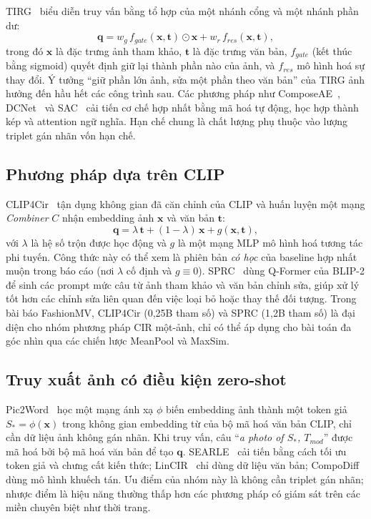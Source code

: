 TIRG~\cite{vo2019tirg} biểu diễn truy vấn bằng tổ hợp của một nhánh cổng và một nhánh phần dư:
\begin{equation}
    \mathbf{q} = w_g\, f_{gate}(\mathbf{x}, \mathbf{t}) \odot \mathbf{x} + w_r\, f_{res}(\mathbf{x}, \mathbf{t}),
\end{equation}
trong đó $\mathbf{x}$ là đặc trưng ảnh tham khảo, $\mathbf{t}$ là đặc trưng văn bản, $f_{gate}$ (kết thúc bằng sigmoid) quyết định giữ lại thành phần nào của ảnh, và $f_{res}$ mô hình hoá sự thay đổi. Ý tưởng ``giữ phần lớn ảnh, sửa một phần theo văn bản'' của TIRG ảnh hưởng đến hầu hết các công trình sau. Các phương pháp như ComposeAE~\cite{anwaar2021composeae}, DCNet~\cite{kim2021dcnet} và SAC~\cite{jandial2022sac} cải tiến cơ chế hợp nhất bằng mã hoá tự động, học hợp thành kép và attention ngữ nghĩa. Hạn chế chung là chất lượng phụ thuộc vào lượng triplet gán nhãn vốn hạn chế.

\subsection{Phương pháp dựa trên CLIP}

CLIP4Cir~\cite{baldrati2022clip4cir} tận dụng không gian đã căn chỉnh của CLIP và huấn luyện một mạng \emph{Combiner} $C$ nhận embedding ảnh $\mathbf{x}$ và văn bản $\mathbf{t}$:
\begin{equation}
    \mathbf{q} = \lambda\,\mathbf{t} + (1 - \lambda)\,\mathbf{x} + g(\mathbf{x}, \mathbf{t}),
\end{equation}
với $\lambda$ là hệ số trộn được học động và $g$ là một mạng MLP mô hình hoá tương tác phi tuyến. Công thức này có thể xem là phiên bản \emph{có học} của baseline hợp nhất muộn trong báo cáo (nơi $\lambda$ cố định và $g \equiv 0$). SPRC~\cite{bai2024sprc} dùng Q-Former của BLIP-2 để sinh các prompt mức câu từ ảnh tham khảo và văn bản chỉnh sửa, giúp xử lý tốt hơn các chỉnh sửa liên quan đến việc loại bỏ hoặc thay thế đối tượng. Trong bài báo FashionMV, CLIP4Cir (0,25B tham số) và SPRC (1,2B tham số) là đại diện cho nhóm phương pháp CIR một-ảnh, chỉ có thể áp dụng cho bài toán đa góc nhìn qua các chiến lược MeanPool và MaxSim.

\subsection{Truy xuất ảnh có điều kiện zero-shot}

Pic2Word~\cite{saito2023pic2word} học một mạng ánh xạ $\phi$ biến embedding ảnh thành một token giả $S_* = \phi(\mathbf{x})$ trong không gian embedding từ của bộ mã hoá văn bản CLIP, chỉ cần dữ liệu ảnh không gán nhãn. Khi truy vấn, câu ``\emph{a photo of $S_*$, $T_{mod}$}'' được mã hoá bởi bộ mã hoá văn bản để tạo $\mathbf{q}$. SEARLE~\cite{baldrati2023searle} cải tiến bằng cách tối ưu token giả và chưng cất kiến thức; LinCIR~\cite{gu2024lincir} chỉ dùng dữ liệu văn bản; CompoDiff~\cite{gu2024compodiff} dùng mô hình khuếch tán. Ưu điểm của nhóm này là không cần triplet gán nhãn; nhược điểm là hiệu năng thường thấp hơn các phương pháp có giám sát trên các miền chuyên biệt như thời trang.

